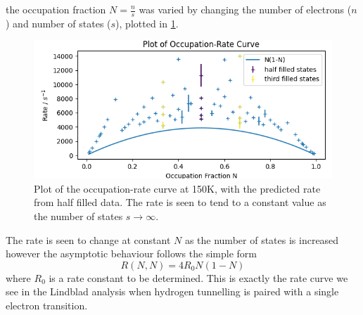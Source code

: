 the occupation fraction
\(N = \frac{n}{s}\) was
varied by changing the
number of electrons (\(n\))
and number of states (\(s\)),
plotted in
\cref{fig:occupation rate curve}.
\begin{figure}
    \centering
    \includegraphics[width=0.7\linewidth]{Figures/Simulation/Occupation Rate Curve.png}
    \caption{Plot of the occupation-rate curve
        at 150K, with the predicted rate from half
        filled data. The rate is seen to
        tend to a constant
        value as the number of states
        \(s\rightarrow{}\infty{}\).
    }\label{fig:occupation rate curve}
\end{figure}
The rate is seen to change
at constant \(N\) as the
number of states is
increased however the asymptotic
behaviour follows the
simple form
\begin{equation}
    R(N,N) = 4 R_0 N(1-N)\label{eqn:degenerate tunnelling rate}
\end{equation}
where \(R_0\) is a
rate constant to be determined.
This is exactly the rate curve
we see in the Lindblad
analysis when hydrogen tunnelling
is paired with a single
electron transition.

